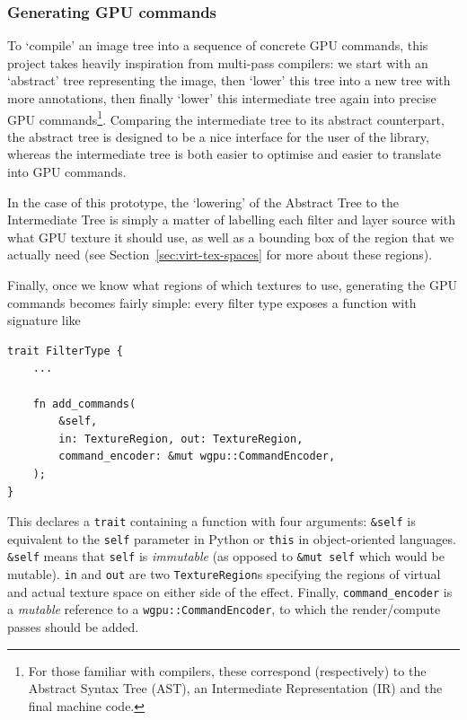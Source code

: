 \documentclass[12pt]{article}
\begin{document}
\subsubsection{Generating GPU commands}\label{sec:gpu-cmds}

To `compile' an image tree into a sequence of concrete GPU commands, this project takes heavily
inspiration from multi-pass compilers: we start with an `abstract' tree representing the image, then
`lower' this tree into a new tree with more annotations, then finally `lower' this intermediate tree
again into precise GPU commands\footnote{For those familiar with compilers, these correspond
(respectively) to the Abstract Syntax Tree (AST), an Intermediate Representation (IR) and the final
machine code.}.  Comparing the intermediate tree to its abstract counterpart, the abstract tree is
designed to be a nice interface for the user of the library, whereas the intermediate tree is both
easier to optimise and easier to translate into GPU commands.

In the case of this prototype, the `lowering' of the Abstract Tree to the Intermediate Tree is
simply a matter of labelling each filter and layer source with what GPU texture it should use, as
well as a bounding box of the region that we actually need (see Section~\ref{sec:virt-tex-spaces}
for more about these regions).

Finally, once we know what regions of which textures to use, generating the GPU commands becomes
fairly simple: every filter type exposes a function with signature like

\begin{verbatim}
trait FilterType {
    ...

    fn add_commands(
        &self,
        in: TextureRegion, out: TextureRegion,
        command_encoder: &mut wgpu::CommandEncoder,
    );
}
\end{verbatim}

This declares a \verb|trait| containing a function with four arguments: \verb|&self| is equivalent
to the \verb|self| parameter in Python or \verb|this| in object-oriented languages.  \verb|&self|
means that \verb|self| is \emph{immutable} (as opposed to \verb|&mut self| which would be mutable).
\verb|in| and \verb|out| are two \verb|TextureRegion|s specifying the regions of virtual and actual
texture space on either side of the effect.  Finally, \verb|command_encoder| is a \emph{mutable}
reference to a \verb|wgpu::CommandEncoder|, to which the render/compute passes should be added.
\end{document}
